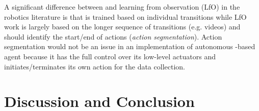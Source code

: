 \documentclass[11pt]{article}
\begin{document}
\begin{comment}
 An Autoencoder is a nonlinear generalization of Principal Component Analysis
 \cite{bourlard1988auto}.
 Therefore, our approach is somewhat similar to an approach that uses PCA
 to run RL in the continuous latent space of the configuration space of a high-DOF
 robot \cite{luck2014latent}.
 Since the latent representation is more compact than the original configuration space of a robot, they can run reinforcement learning more efficiently.
\end{comment}


A significant difference between \latentplanner and learning from observation (LfO) in the robotics literature \cite{ArgallCVB09} is that
\latentplanner is trained based on individual transitions
while LfO work is largely based on the longer sequence of transitions (e.g. videos)
and should identify the start/end of actions (\emph{action segmentation}).
% 
Action segmentation would not be an issue in 
an implementation of autonomous \latentplanner-based agent
because it has the full control over its low-level actuators and
initiates/terminates its own action for the data collection.



\section{Discussion and Conclusion}

\label{sec:discussion}

\end{document}
